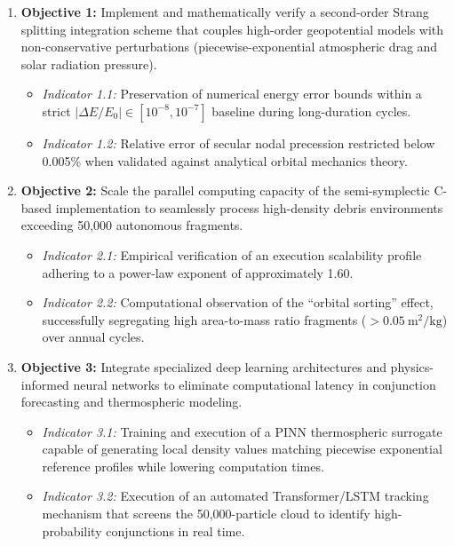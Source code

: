 \documentclass[11pt,letterpaper]{article}
\begin{document}
\begin{enumerate}
    \item \textbf{Objective 1:} Implement and mathematically verify a second-order Strang splitting integration scheme that couples high-order geopotential models with non-conservative perturbations (piecewise-exponential atmospheric drag and solar radiation pressure).
    \begin{itemize}
        \item \emph{Indicator 1.1:} Preservation of numerical energy error bounds within a strict $|\Delta E / E_0| \in [10^{-8}, 10^{-7}]$ baseline during long-duration cycles.
        \item \emph{Indicator 1.2:} Relative error of secular nodal precession restricted below 0.005\% when validated against analytical orbital mechanics theory.
    \end{itemize}
    \item \textbf{Objective 2:} Scale the parallel computing capacity of the semi-symplectic C-based implementation to seamlessly process high-density debris environments exceeding 50,000 autonomous fragments.
    \begin{itemize}
        \item \emph{Indicator 2.1:} Empirical verification of an execution scalability profile adhering to a power-law exponent of approximately 1.60.
        \item \emph{Indicator 2.2:} Computational observation of the ``orbital sorting'' effect, successfully segregating high area-to-mass ratio fragments ($>0.05~\text{m}^2/\text{kg}$) over annual cycles.
    \end{itemize}
    \item \textbf{Objective 3:} Integrate specialized deep learning architectures and physics-informed neural networks to eliminate computational latency in conjunction forecasting and thermospheric modeling.
    \begin{itemize}
        \item \emph{Indicator 3.1:} Training and execution of a PINN thermospheric surrogate capable of generating local density values matching piecewise exponential reference profiles while lowering computation times.
        \item \emph{Indicator 3.2:} Execution of an automated Transformer/LSTM tracking mechanism that screens the 50,000-particle cloud to identify high-probability conjunctions in real time.
    \end{itemize}
\end{enumerate}
\end{document}
